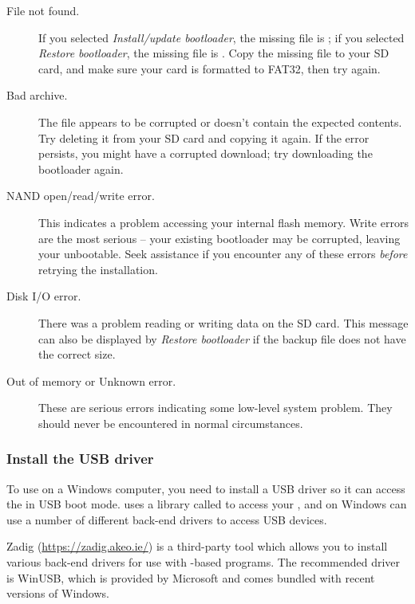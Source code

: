 \begin{description}
\item[File not found.]
  If you selected \emph{Install/update bootloader}, the missing file is
  \bootfilename{}; if you selected \emph{Restore bootloader}, the missing file
  is \bootbackupfilename{}. Copy the missing file to your SD card, and make
  sure your card is formatted to FAT32, then try again.
\item[Bad archive.]
  The file \bootfilename{} appears to be corrupted or doesn't contain the
  expected contents. Try deleting it from your SD card and copying it again.
  If the error persists, you might have a corrupted download; try downloading
  the bootloader again.
\item[NAND open/read/write error.]
  This indicates a problem accessing your \daps{} internal flash memory.
  Write errors are the most serious -- your existing bootloader may be
  corrupted, leaving your \dap{} unbootable. Seek assistance if you encounter
  any of these errors \emph{before} retrying the installation.
\item[Disk I/O error.]
  There was a problem reading or writing data on the SD card. This message can
  also be displayed by \emph{Restore bootloader} if the backup file
  \bootbackupfilename{} does not have the correct size.
\item[Out of memory or Unknown error.]
  These are serious errors indicating some low-level system problem.
  They should never be encountered in normal circumstances.
\end{description}

\subsubsection{Install the USB driver}\label{ref:install_usb_driver}

To use  on a Windows computer, you need to install a USB driver
so it can access the \dap{} in USB boot mode.  uses a library
called  to access your \dap{}, and on Windows  can
use a number of different back-end drivers to access USB devices.

Zadig (\url{https://zadig.akeo.ie/}) is a third-party tool which allows you to
install various back-end drivers for use with -based programs.
The recommended driver is WinUSB, which is provided by Microsoft and comes
bundled with recent versions of Windows.

